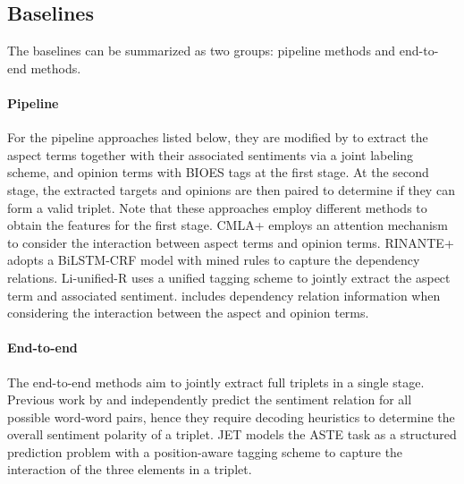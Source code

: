 \documentclass[11pt,a4paper]{article}
\begin{document}
\subsection{Baselines}

The baselines can be summarized as two groups: pipeline methods and end-to-end methods.

\paragraph{Pipeline} 

For the pipeline approaches listed below, they are modified by \citet{peng2019knowing} to extract the aspect terms together with their associated sentiments via a joint labeling scheme, and opinion terms with BIOES tags at the first stage. At the second stage, the extracted targets and opinions are then paired to determine if they can form a valid triplet. Note that these approaches employ different methods to obtain the features for the first stage.
{CMLA+} \cite{wang2017coupled} employs an attention mechanism to consider the interaction between aspect terms and opinion terms.
{RINANTE+} \cite{dai2019neural} adopts a BiLSTM-CRF model with mined rules to capture the dependency relations.
{Li-unified-R} \cite{li2019unified} uses a unified tagging scheme to 
jointly extract the aspect term and associated sentiment.
\citet{peng2019knowing} includes dependency relation information when considering the interaction between the aspect and opinion terms. 

\paragraph{End-to-end} 
The end-to-end methods aim to jointly extract full triplets in a single stage.  
Previous work by \citet{zhang-etal-2020-multi-task} and \citet{wu-etal-2020-grid} independently predict the sentiment relation for all possible word-word pairs, hence they require decoding heuristics to determine the overall sentiment polarity of a triplet. 
JET \cite{Xu2020PositionAwareTF} models the ASTE task as a structured prediction problem with a position-aware tagging scheme to capture the interaction of the three elements in a triplet.
\end{document}

